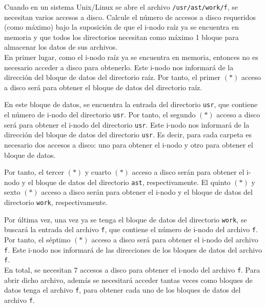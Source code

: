 \begin{ejercicio}
Cuando en un sistema Unix/Linux se abre el archivo \verb|/usr/ast/work/f|,
se necesitan varios accesos a disco. Calcule el número de accesos a disco requeridos
(como máximo) bajo la suposición de que el i-nodo raíz ya se encuentra en memoria y que
todos los directorios necesitan como máximo 1 bloque para almacenar los datos de sus archivos.\\

En primer lugar, como el i-nodo raíz ya se encuentra en memoria, entonces no es necesario
acceder a disco para obtenerlo. Este i-nodo nos informará de la dirección del bloque
de datos del directorio raíz. Por tanto, el primer $(\ast)$ acceso a disco será
para obtener el bloque de datos del directorio raíz.

En este bloque de datos,
se encuentra la entrada del directorio \verb|usr|, que contiene el número de i-nodo
del directorio \verb|usr|. Por tanto, el segundo $(\ast)$ acceso a disco será para
obtener el i-nodo del directorio \verb|usr|. Este i-nodo nos informará de la dirección
del bloque de datos del directorio \verb|usr|. Es decir, para cada carpeta es necesario
dos accesos a disco: uno para obtener el i-nodo y otro para obtener el bloque de datos.

Por tanto, el tercer $(\ast)$ y cuarto $(\ast)$ acceso a disco serán para obtener el i-nodo
y el bloque de datos del directorio \verb|ast|, respectivamente. El quinto $(\ast)$ y sexto $(\ast)$
acceso a disco serán para obtener el i-nodo y el bloque de datos del directorio \verb|work|,
respectivamente.

Por última vez, una vez ya se tenga el bloque de datos del directorio \verb|work|,
se buscará la entrada del archivo \verb|f|, que contiene el número de i-nodo del archivo \verb|f|.
Por tanto, el séptimo $(\ast)$ acceso a disco será para obtener el i-nodo del archivo \verb|f|.
Este i-nodo nos informará de las direcciones de los bloques de datos del archivo \verb|f|.\\

En total, se necesitan $7$ accesos a disco para obtener el i-nodo del archivo \verb|f|.
Para abrir dicho archivo, además se necesitará acceder tantas veces como bloques de datos
tenga el archivo \verb|f|, para obtener cada uno de los bloques de datos del archivo \verb|f|.
\end{ejercicio}

